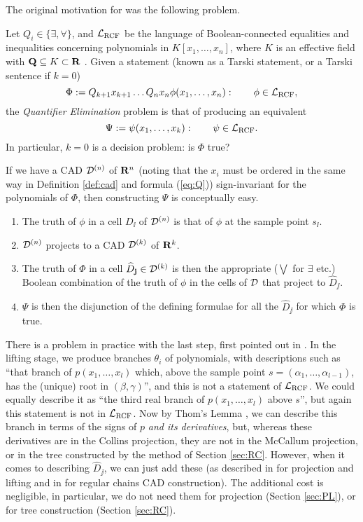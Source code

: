 \documentclass[runningheads,a4paper]{llncs}
\begin{document}
The original motivation for \cite{Collins1975} was the following problem.
\begin{problem}Let $Q_i\in\{\exists,\forall\}$, and ${{\cal L}_{\rm RCF}}$ be the language of Boolean-connected equalities and inequalities concerning polynomials in $K[x_1,\allowbreak\ldots,x_n]$, where $K$ is an effective field with ${\mathbf Q}\subseteq K\subset{\mathbf R}$ . Given a statement (known as a Tarski statement, or a Tarski sentence if $k=0$)
\begin{equation}\label{eq:Q}
\Phi:=Q_{k+1}x_{k+1}\ldots Q_nx_n \phi(x_1,\ldots,x_n): \qquad \phi\in {{\cal L}_{\rm RCF}},
\end{equation}
the \emph{Quantifier Elimination} problem is that of producing an equivalent
\begin{equation}\label{eq:QF}
\Psi:=\psi(x_1,\ldots,x_k) : \qquad \psi\in {{\cal L}_{\rm RCF}}.
\end{equation}
In particular, $k=0$ is a decision problem: is $\Phi$ true?
\end{problem}
If we have a CAD ${\cal D}^{(n)}$ of ${\mathbf R}^n$ (noting that the $x_i$  must be ordered in the same way in Definition \ref{def:cad} and formula (\ref{eq:Q})) sign-invariant for the polynomials of $\Phi$, then constructing $\Psi$ is conceptually easy.
\begin{enumerate}
\item The truth of $\phi$ in a cell $D_\ii$ of ${\cal D}^{(n)}$  is that of $\phi$ at the sample point $s_\ii$.\label{first}
\item ${\cal D}^{(n)}$ projects to a  CAD ${\cal D}^{(k)}$ of ${\mathbf R}^k$.
\item The truth of $\Phi$ in a cell $\widehat D_{\bf j}\in {\cal D}^{(k)}$ is then the appropriate ($\bigvee$ for $\exists$ etc.) Boolean combination of the truth of $\phi$ in the cells of ${\cal D}$ that project to $\widehat D_\jj$.\label{step:bool}
\item $\Psi$ is then the disjunction of the defining formulae for all the $\widehat D_\jj$ for which $\Phi$ is true.\label{last}
\end{enumerate}
There is a problem in practice with the last step, first pointed out in \cite{Brown1999a}. In the lifting stage, we produce branches $\theta_i$ of polynomials, with descriptions such as ``that branch of $p(x_1,\ldots,x_l)$ which, above the sample point $s=(\alpha_1,\ldots,\alpha_{l-1})$, has the (unique) root in $(\beta,\gamma)$'', and this is not a statement of ${{\cal L}_{\rm RCF}}$. We could equally describe it as ``the third real branch of $p(x_1,\ldots,x_l)$ above $s$'', but again this statement is not in ${{\cal L}_{\rm RCF}}$. Now by Thom's Lemma \cite{CosteRoy1988}, we can describe this branch in terms of the signs of $p$ \emph{and its derivatives}, but, whereas these derivatives are in the Collins projection, they are not in the McCallum projection, or in the tree constructed by the method of Section \ref{sec:RC}. However, when it comes to describing $\widehat D_\jj$, we can just add these (as described in \cite{Brown1999a} for projection and lifting and in \cite{CM14} for regular chains CAD construction). The additional cost is negligible, in particular, we do not need them for projection (Section \ref{sec:PL}), or for tree construction (Section \ref{sec:RC}).
\end{document}
